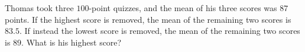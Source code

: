 Thomas took three $100$-point quizzes, and the mean of his three scores was $87$ points. If the highest score is removed, the mean of the remaining two scores is $83.5$. If instead the lowest score is removed, the mean of the remaining two scores is $89$. What is his highest score?
